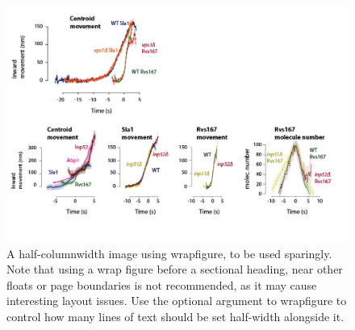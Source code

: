 \documentclass[9pt,lineno]{elife}
\begin{document}


\begin{figure}
	\includegraphics[width=\hsize]{figures/vps1_placeholder}
	\caption{A half-columnwidth image using wrapfigure, to be used sparingly. Note that using a wrap figure before a sectional heading, near other floats or page boundaries is not recommended, as it may cause interesting layout issues. Use the optional argument to wrapfigure to control how many lines of text should be set half-width alongside it.}
	\label{fig:halfwidth}
\end{figure}
\end{document}
